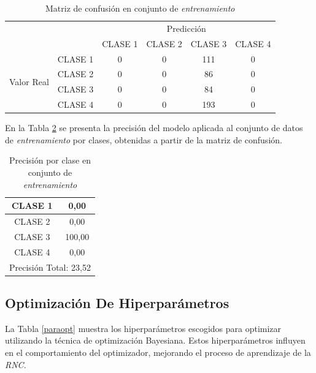 \begin{table}[htbp]
	\centering
	\resizebox{10cm}{!} {
		\begin{tabular}{|c|l|c|c|c|c|}
			\hline
			\multicolumn{2}{|c|}{\multirow{2}[4]{*}{}} & \multicolumn{4}{c|}{Predicción} \bigstrut\\
			\cline{3-6}    \multicolumn{2}{|c|}{} & CLASE 1 & CLASE 2 & CLASE 3 & CLASE 4 \bigstrut\\
			\hline
			\multirow{4}[8]{*}{\begin{sideways}Valor Real\end{sideways}} & CLASE 1 & 0     & 0     & 111    & 0 \bigstrut\\
			\cline{2-6}          & CLASE 2 & 0     & 0     & 86    & 0 \bigstrut\\
			\cline{2-6}          & CLASE 3 & 0     & 0     & 84    & 0 \bigstrut\\
			\cline{2-6}          & CLASE 4 & 0     & 0     & 193    & 0 \bigstrut\\
			\hline
		\end{tabular}%
	}
	\caption{Matriz de confusión en conjunto de \textit{entrenamiento}}
	\label{MC_RESNET18_2}
\end{table}%

En la Tabla \ref*{clase_RESNET18_2} se presenta la precisión del modelo aplicada al conjunto de datos de \textit{entrenamiento} por clases, obtenidas a partir de la matriz de confusión.

\begin{table}[htbp]
	\centering
	\begin{tabular}{|c|c|}
		\hline
		CLASE 1 & 0,00 \bigstrut\\
		\hline
		CLASE 2 & 0,00 \bigstrut\\
		\hline
		CLASE 3 & 100,00 \bigstrut\\
		\hline
		CLASE 4 & 0,00 \bigstrut\\
		\hline
		\multicolumn{2}{|c|}{Precisión Total: 23,52} \bigstrut\\
		\hline
	\end{tabular}%
	\caption{Precisión por clase en conjunto de \textit{entrenamiento}}
	\label{clase_RESNET18_2}
\end{table}%

\subsection{Optimización De Hiperparámetros}

La Tabla \ref{paraopt} muestra los hiperparámetros escogidos para optimizar utilizando la técnica de optimización Bayesiana. Estos hiperparámetros influyen en el comportamiento del optimizador, mejorando el proceso de aprendizaje de la \textit{RNC}.  

